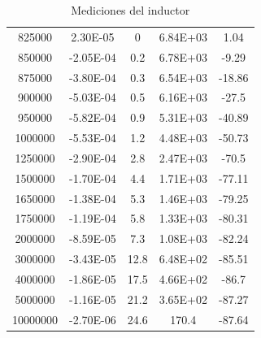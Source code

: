 \begin{table}[H]
{\begin{tabular}{ccccc}
            825000 & 2.30E-05 & 0 & 6.84E+03 & 1.04 \\
            850000 & -2.05E-04 & 0.2 & 6.78E+03 & -9.29 \\
            875000 & -3.80E-04 & 0.3 & 6.54E+03 & -18.86 \\
            900000 & -5.03E-04 & 0.5 & 6.16E+03 & -27.5 \\
            950000 & -5.82E-04 & 0.9 & 5.31E+03 & -40.89 \\
            1000000 & -5.53E-04 & 1.2 & 4.48E+03 & -50.73 \\
            1250000 & -2.90E-04 & 2.8 & 2.47E+03 & -70.5 \\
            1500000 & -1.70E-04 & 4.4 & 1.71E+03 & -77.11 \\
            1650000 & -1.38E-04 & 5.3 & 1.46E+03 & -79.25 \\
            1750000 & -1.19E-04 & 5.8 & 1.33E+03 & -80.31 \\
            2000000 & -8.59E-05 & 7.3 & 1.08E+03 & -82.24 \\
            3000000 & -3.43E-05 & 12.8 & 6.48E+02 & -85.51 \\
            4000000 & -1.86E-05 & 17.5 & 4.66E+02 & -86.7 \\
            5000000 & -1.16E-05 & 21.2 & 3.65E+02 & -87.27 \\
            10000000 & -2.70E-06 & 24.6 & 170.4 & -87.64 \\ \hline
        \end{tabular}%
    }
    \caption{Mediciones del inductor}
    \label{tab:Med_IND}
\end{table}
